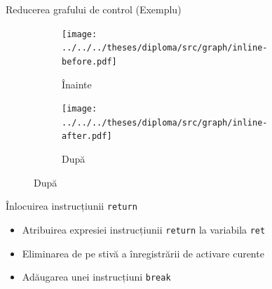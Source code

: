 \documentclass{beamer}
\def\code#1{\texttt{#1}}
\begin{document}

\begin{frame}{Reducerea grafului de control (Exemplu)}
    \begin{figure}[htb]
        \begin{subfigure}[b]{.42\textwidth}
            \centering
            \texttt{[image: ../../../theses/diploma/src/graph/inline-before.pdf]}
            \caption{Înainte}
        \end{subfigure}
        \hfill
        \begin{subfigure}[b]{.42\textwidth}
            \centering
            \texttt{[image: ../../../theses/diploma/src/graph/inline-after.pdf]}
            \caption{După}
        \end{subfigure}
    \end{figure}
\end{frame}

\begin{frame}{Înlocuirea instrucțiunii \code{return}}
    \begin{itemize}
        \item Atribuirea expresiei instrucțiunii \code{return} la variabila \code{ret}
        \item Eliminarea de pe stivă a înregistrării de activare curente
        \item Adăugarea unei instrucțiuni \code{break}
\end{itemize}
\end{frame}
\end{document}
